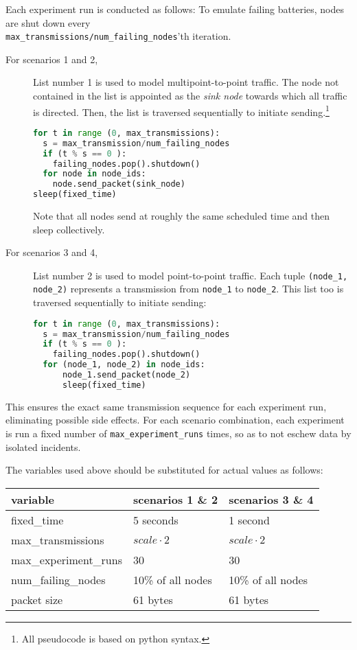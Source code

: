 \documentclass{acm_proc_article-sp}
\begin{document}
Each experiment run is conducted as follows:
To emulate failing batteries, nodes are shut down every\\
\texttt{max\_transmissions/num\_failing\_nodes}'th iteration.
\begin{description}
\item[For scenarios 1 and 2,] List number 1 is used to model multipoint-to-point traffic. The node not contained in the list is appointed as the \emph{sink node} towards which all traffic is directed. Then, the list is traversed sequentially to initiate sending.\footnote{All pseudocode is based on python syntax.} %
\begin{lstlisting}[language=python]
for t in range (0, max_transmissions):
  s = max_transmission/num_failing_nodes
  if (t % s == 0 ):
    failing_nodes.pop().shutdown()
  for node in node_ids:
    node.send_packet(sink_node)
sleep(fixed_time)
\end{lstlisting}
Note that all nodes send at roughly the same scheduled time and then sleep collectively.
\item[For scenarios 3 and 4,] List number 2 is used to model point-to-point traffic. Each tuple \texttt{(node\_1, node\_2)} represents a transmission from \texttt{node\_1} to \texttt{node\_2}. This list too is traversed sequentially to initiate sending:
\begin{lstlisting}[language=python]
for t in range (0, max_transmissions):
  s = max_transmission/num_failing_nodes
  if (t % s == 0 ):
    failing_nodes.pop().shutdown()
  for (node_1, node_2) in node_ids:
      node_1.send_packet(node_2)
      sleep(fixed_time)
\end{lstlisting}
\end{description}
This ensures the exact same transmission sequence for each experiment run, eliminating possible side effects.
For each scenario combination, each experiment is run a fixed number of \texttt{max\_experiment\_runs} times, so as to not eschew data by isolated incidents.

The variables used above should be substituted for actual values as follows:

\begin{tabularx}{\linewidth}{l | l | l}
  variable & scenarios 1 \& 2 & scenarios 3 \& 4  \\
  \hline
  fixed\_time & 5 seconds & 1 second \\ %
  max\_transmissions & $scale \cdot 2$ & $scale \cdot 2$ \\
  max\_experiment\_runs & 30 & 30 \\
  num\_failing\_nodes & 10\% of all nodes & 10\% of all nodes \\
  packet size & 61 bytes & 61 bytes
\end{tabularx}
\end{document}
